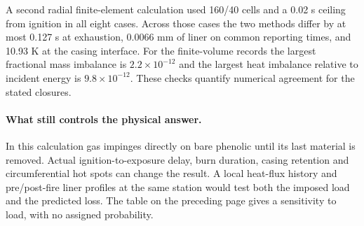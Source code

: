 A second radial finite-element calculation used 160/40 cells and a 0.02 s
ceiling from ignition in all eight cases. Across those cases the two methods
differ by at most 0.127 s at exhaustion, 0.0066 mm of liner on
common reporting times, and 10.93 K at the casing interface. For the
finite-volume records the largest fractional mass imbalance is $2.2\times 10^{-12}$ and
the largest heat imbalance relative to incident energy is $9.8\times 10^{-12}$.
These checks quantify numerical agreement for the stated closures.
\paragraph{What still controls the physical answer.}
In this calculation gas impinges directly on bare phenolic until its last
material is removed. Actual ignition-to-exposure delay, burn duration, casing
retention and circumferential hot spots can change the result. A local
heat-flux history and pre/post-fire liner profiles at the same station would
test both the imposed load and the predicted loss. The table on the preceding
page gives a sensitivity to load, with no assigned probability.
\clearpage
